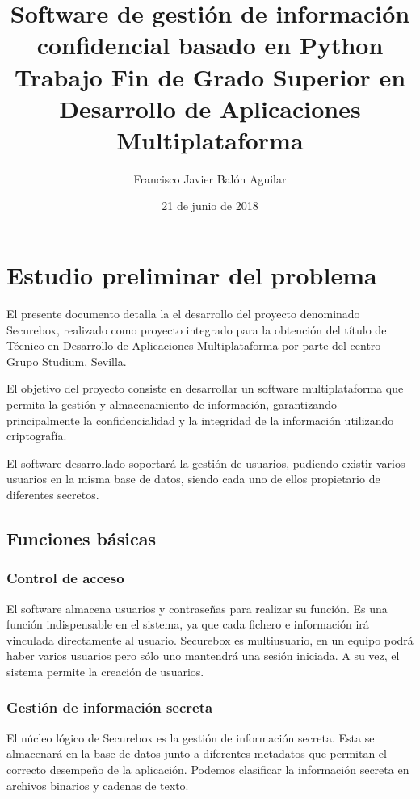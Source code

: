 \documentclass[a4paper, 11pt, titlepage]{article}
\title{\textbf{Software de gestión de información confidencial basado en Python}\\ 
Trabajo Fin de Grado Superior en Desarrollo de Aplicaciones Multiplataforma}
\author{Francisco Javier Balón Aguilar}
\date{21 de junio de 2018}
\begin{document}
\maketitle
\renewcommand{\contentsname}{Índice}
\tableofcontents
\newpage

\section{Estudio preliminar del problema}

    El presente documento detalla la el desarrollo del proyecto denominado Securebox, 
    realizado como proyecto integrado para la obtención del título de Técnico en 
    Desarrollo de Aplicaciones Multiplataforma por parte del centro Grupo Studium, 
    Sevilla. 

    El objetivo del proyecto consiste en desarrollar un software multiplataforma que 
    permita la gestión y almacenamiento de información, garantizando principalmente 
    la confidencialidad y la integridad de la información utilizando criptografía. 

    El software desarrollado soportará la gestión de usuarios, pudiendo existir 
    varios usuarios en la misma base de datos, siendo cada uno de ellos propietario 
    de diferentes secretos. 

    \subsection{Funciones básicas}

        \subsubsection{Control de acceso}

            El software almacena usuarios y contraseñas para realizar su función. 
            Es una función indispensable en el sistema, ya que cada fichero e 
            información irá vinculada directamente al usuario. Securebox es multiusuario, 
            en un equipo podrá haber varios usuarios pero sólo uno mantendrá una sesión 
            iniciada. A su vez, el sistema permite la creación de usuarios.

        \subsubsection{Gestión de información secreta}

            El núcleo lógico de Securebox es la gestión de información secreta. Esta 
            se almacenará en la base de datos junto a diferentes metadatos que permitan 
            el correcto desempeño de la aplicación. Podemos clasificar la información 
            secreta en archivos binarios y cadenas de texto.
\end{document}
